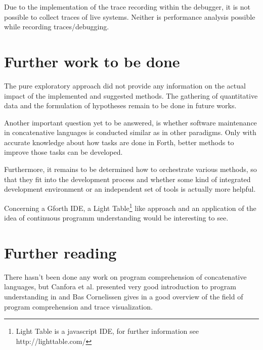 Due to the implementation of the trace recording within the debugger, it is not possible to collect traces of live systems. Neither is performance analysis possible while recording traces/debugging.
 

\section{Further work to be done}

The pure exploratory approach did not provide any information on the actual impact of the implemented and suggested methods. The gathering of quantitative data and the formulation of hypotheses remain to be done in future works.

Another important question yet to be answered, is whether software maintenance in concatenative languages is conducted similar as in other paradigms. Only with accurate knowledge about how tasks are done in Forth, better methods to improve those tasks can be developed.

Furthermore, it remains to be determined how to orchestrate various methods, so that they fit into the development process and whether some kind of integrated development environment or an independent set of tools is actually more helpful.

Concerning a Gforth IDE, a Light Table\footnote{Light Table is a javascript IDE, for further information see http://lighttable.com/} like approach and an application of the idea of continuous programm understanding\cite{Muller:2000:RER:336512.336526} would be interesting to see.


\section{Further reading}

There hasn't been done any work on program comprehension of concatenative languages, but Canfora et al. presented  very good introduction to program understanding in \cite{Canfora:2011:ACS:1924421.1924451} and Bas Cornelissen gives in \cite{Cornelissen2009} a good overview of the field of program comprehension and trace visualization.